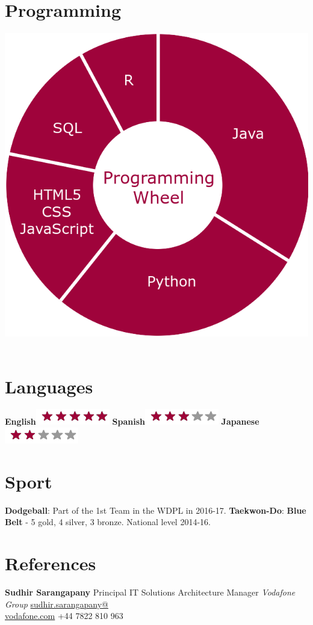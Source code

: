 \documentclass[]{friggeri-cv}
\begin{document}
\begin{aside}
    \section{Programming}
        \includegraphics[scale=0.15]{img/programmingwheel.png}
    ~

    \section{Languages}
        \textbf{English}\includegraphics[scale=0.40]{img/5stars.png}
        \textbf{Spanish}\includegraphics[scale=0.40]{img/3stars.png}
        \textbf{Japanese}\includegraphics[scale=0.40]{img/2stars.png}
    ~
    \section{Sport}
        \textbf{Dodgeball}:
        Part of the 1st Team in the WDPL in 2016-17.
        \textbf{Taekwon-Do}:
        \textbf{Blue Belt} - 5 gold, 4 silver, 3 bronze.
        National level 2014-16.
    ~
    \section{References}
        \textbf{Sudhir Sarangapany}
        Principal IT Solutions Architecture Manager
        \emph{Vodafone Group}
        \href{mailto:sudhir.sarangapany@vodafone.com}{sudhir.sarangapany@\\vodafone.com}
        +44 7822 810 963
    ~
\end{aside}
\end{document}
